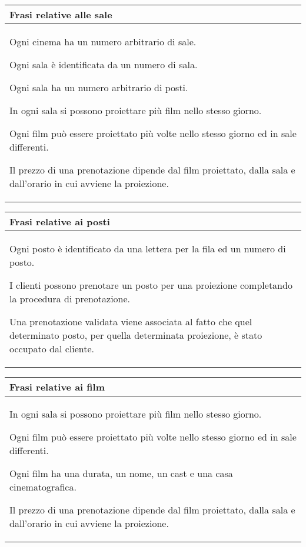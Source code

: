 \begin{tabularx}{\linewidth}{|X|}
    \hline
    \rowcolor{tblhdrcolor}
    \textbf{Frasi relative alle sale} \\\hline
    Ogni cinema ha un numero arbitrario di sale.

    Ogni sala è identificata da un numero di sala.

    Ogni sala ha un numero arbitrario di posti.

    In ogni sala si possono proiettare più film nello stesso giorno.

    Ogni film può essere proiettato più volte nello stesso giorno ed
    in sale differenti.

    Il prezzo di una prenotazione dipende dal film proiettato,
    dalla sala e dall'orario in cui avviene la proiezione.
    \\ \hline
\end{tabularx}

\begin{tabularx}{\linewidth}{|X|}
    \hline
    \rowcolor{tblhdrcolor}
    \textbf{Frasi relative ai posti} \\\hline
    Ogni posto è identificato da una lettera per la fila ed un numero
    di posto.

    I clienti possono prenotare un posto per una proiezione completando la
    procedura di prenotazione.

    Una prenotazione validata viene associata al fatto che quel determinato
    posto, per quella determinata proiezione, è stato occupato dal cliente.
    \\ \hline
\end{tabularx}

\begin{tabularx}{\linewidth}{|X|}
    \hline
    \rowcolor{tblhdrcolor}
    \textbf{Frasi relative ai film} \\\hline
    In ogni sala si possono proiettare più film nello stesso giorno.

    Ogni film può essere proiettato più volte nello stesso giorno ed
    in sale differenti.

    Ogni film ha una durata, un nome, un cast e una
    casa cinematografica.

    Il prezzo di una prenotazione dipende dal film proiettato,
    dalla sala e dall'orario in cui avviene la proiezione.
    \\ \hline
\end{tabularx}

